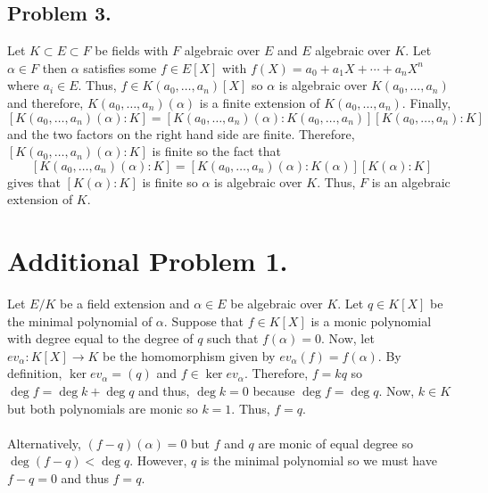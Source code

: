 \documentclass[12pt]{extarticle}
\begin{document}
\subsection*{Problem 3.}
Let $K \subset E \subset F$ be fields with $F$ algebraic over $E$ and $E$ algebraic over $K$. Let $\alpha \in F$ then $\alpha$ satisfies some $f \in E[X]$ with $f(X) = a_0 + a_1 X + \cdots + a_n X^n$ where $a_i \in E$. Thus, $f \in K(a_0, \dots, a_n)[X]$ so $\alpha$ is algebraic over $K(a_0, \dots, a_n)$ and therefore, $K(a_0, \dots, a_n)(\alpha)$ is a finite extension of $K(a_0, \dots, a_n)$. Finally, \[[K(a_0, \dots, a_n)(\alpha) : K] = [K(a_0, \dots, a_n)(\alpha) : K(a_0, \dots, a_n)][K(a_0, \dots, a_n) : K]\] and the two factors on the right hand side are finite. Therefore, $[K(a_0, \dots, a_n)(\alpha) : K]$ is finite so the fact that \[[K(a_0, \dots, a_n)(\alpha) : K] = [K(a_0, \dots, a_n)(\alpha) : K(\alpha)][K(\alpha) : K]\] gives that $[K(\alpha) : K]$ is finite so $\alpha$ is algebraic over $K$. Thus, $F$ is an algebraic extension of $K$.     

\section*{Additional Problem 1.}

Let $E / K$ be a field extension and $\alpha \in E$ be algebraic over $K$. Let $q \in K[X]$ be the minimal polynomial of $\alpha$. Suppose that $f \in K[X]$ is a monic polynomial with degree equal to the degree of $q$ such that $f(\alpha) = 0$. Now, let $ev_\alpha : K[X] \to K$ be the homomorphism given by $ev_\alpha(f) = f(\alpha)$. By definition, $\ker{ev_\alpha} = (q)$ and $f \in \ker{ev_\alpha}$. Therefore, $f = kq$ so $\deg{f} = \deg{k} + \deg{q}$ and thus, $\deg{k} = 0$ because $\deg{f} = \deg{q}$. Now, $k \in K$ but both polynomials are monic so $k = 1$. Thus, $f = q$. \\\\
Alternatively, $(f - q)(\alpha) = 0$ but $f$ and $q$ are monic of equal degree so $\deg{(f - q)} < \deg{q}$. However, $q$ is the minimal polynomial so we must have $f - q = 0$ and thus $f = q$.
\end{document}
